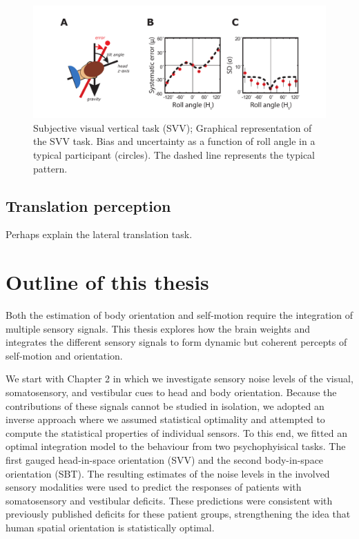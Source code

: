 \begin{figure}
    \includegraphics[width=1.0\textwidth]{src/intro/figures/svv.pdf}

    \caption{Subjective visual vertical task (SVV);  Graphical representation of the SVV task.  Bias and  uncertainty as a function of roll angle in a typical participant (circles). The dashed line represents the typical pattern.}
    \label{intro:fig5}
\end{figure}

\subsection{Translation perception}

Perhaps explain the lateral translation task.


\section{Outline of this thesis}

Both the estimation of body orientation and self-motion require the integration of multiple sensory signals. This thesis explores how the brain weights and integrates the different sensory signals to form dynamic but coherent percepts of self-motion and orientation.

We start with Chapter 2 in which we investigate sensory noise levels of the visual, somatosensory, and vestibular cues to head and body orientation. Because the contributions of these signals cannot be studied in isolation, we adopted an inverse approach where we assumed statistical optimality and attempted to compute the statistical properties of individual sensors. To this end, we fitted an optimal integration model to the behaviour from two psychophyisical tasks. The first gauged head-in-space orientation (SVV) and the second body-in-space orientation (SBT). The resulting estimates of the noise levels in the involved sensory modalities were used to predict the responses of patients with somatosensory and vestibular deficits. These predictions were consistent with previously published deficits for these patient groups, strengthening the idea that human spatial orientation is statistically optimal.

